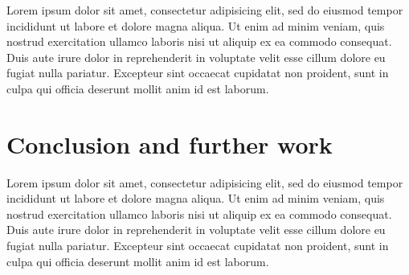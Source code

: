 \documentclass[times, utf8, seminar]{fer}
\begin{document}
Lorem ipsum dolor sit amet, consectetur adipisicing elit, sed do eiusmod tempor incididunt ut labore et dolore magna aliqua. Ut enim ad minim veniam, quis nostrud exercitation ullamco laboris nisi ut aliquip ex ea commodo consequat. Duis aute irure dolor in reprehenderit in voluptate velit esse cillum dolore eu fugiat nulla pariatur. Excepteur sint occaecat cupidatat non proident, sunt in culpa qui officia deserunt mollit anim id est laborum.

\chapter{Conclusion and further work}
Lorem ipsum dolor sit amet, consectetur adipisicing elit, sed do eiusmod tempor incididunt ut labore et dolore magna aliqua. Ut enim ad minim veniam, quis nostrud exercitation ullamco laboris nisi ut aliquip ex ea commodo consequat. Duis aute irure dolor in reprehenderit in voluptate velit esse cillum dolore eu fugiat nulla pariatur. Excepteur sint occaecat cupidatat non proident, sunt in culpa qui officia deserunt mollit anim id est laborum.
% 
% 
% 
\end{document}
